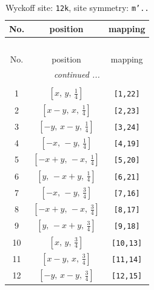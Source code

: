 \documentclass[fleqn,8pt]{jsarticle}
\begin{document}
\begin{longtable}{ccc}
\caption{Wyckoff site: {\tt 12k}, site symmetry: {\tt m'..}}
 \\
 \hline \hline
No. & position & mapping \\ \hline \endfirsthead

\multicolumn{2}{l}{\tablename\ \thetable{}} \\
 \hline \hline
No. & position & mapping \\ \hline \endhead

 \hline \hline
\multicolumn{2}{r}{\footnotesize\it continued ...} \\ \endfoot

 \hline \hline
\multicolumn{2}{r}{} \\ \endlastfoot

1 & $\left[ x,\, y,\, \frac{1}{4} \right]$ & {\tt [1,22]} \\ \hline
2 & $\left[ x - y,\, x,\, \frac{1}{4} \right]$ & {\tt [2,23]} \\ \hline
3 & $\left[ - y,\, x - y,\, \frac{1}{4} \right]$ & {\tt [3,24]} \\ \hline
4 & $\left[ - x,\, - y,\, \frac{1}{4} \right]$ & {\tt [4,19]} \\ \hline
5 & $\left[ - x + y,\, - x,\, \frac{1}{4} \right]$ & {\tt [5,20]} \\ \hline
6 & $\left[ y,\, - x + y,\, \frac{1}{4} \right]$ & {\tt [6,21]} \\ \hline
7 & $\left[ - x,\, - y,\, \frac{3}{4} \right]$ & {\tt [7,16]} \\ \hline
8 & $\left[ - x + y,\, - x,\, \frac{3}{4} \right]$ & {\tt [8,17]} \\ \hline
9 & $\left[ y,\, - x + y,\, \frac{3}{4} \right]$ & {\tt [9,18]} \\ \hline
10 & $\left[ x,\, y,\, \frac{3}{4} \right]$ & {\tt [10,13]} \\ \hline
11 & $\left[ x - y,\, x,\, \frac{3}{4} \right]$ & {\tt [11,14]} \\ \hline
12 & $\left[ - y,\, x - y,\, \frac{3}{4} \right]$ & {\tt [12,15]} \\
\end{longtable}
\renewcommand{\arraystretch}{1.2}
\end{document}
